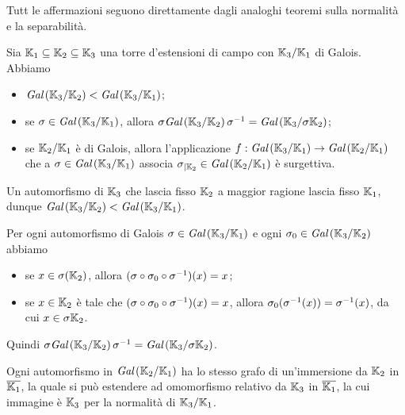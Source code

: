 \Proof Tutt le affermazioni seguono direttamente dagli analoghi teoremi sulla normalit\`a e la separabilit\`a. \EndProof
\begin{Theorem}
	Sia $\mathbb{K}_1 \subseteq \mathbb{K}_2 \subseteq \mathbb{K}_3$ una torre d'estensioni di campo con $\mathbb{K}_3/\mathbb{K}_1$ di Galois. Abbiamo
	\begin{itemize}
		\item $\textit{Gal} \left ( \mathbb{K}_3/\mathbb{K}_2 \right ) < \textit{Gal} \left ( \mathbb{K}_3/\mathbb{K}_1 \right )$;
		\item se $\sigma \in \textit{Gal} \left ( \mathbb{K}_3/\mathbb{K}_1 \right )$, allora $\sigma\textit{Gal} \left ( \mathbb{K}_3/\mathbb{K}_2 \right )\sigma^{-1} = \textit{Gal} \left ( \mathbb{K}_3/\sigma{\mathbb{K}_2} \right )$;
		\item se $\mathbb{K}_2/\mathbb{K}_1$ \`e di Galois, allora l'applicazione $f: \textit{Gal} \left ( \mathbb{K}_3/\mathbb{K}_1 \right ) \rightarrow \textit{Gal} \left ( \mathbb{K}_2/\mathbb{K}_1 \right )$ che a $\sigma \in \textit{Gal} \left ( \mathbb{K}_3/\mathbb{K}_1 \right )$ associa ${\sigma}_{|\mathbb{K}_2} \in \textit{Gal} \left ( \mathbb{K}_2/\mathbb{K}_1 \right )$ \`e surgettiva.
	\end{itemize}
\end{Theorem}
\Proof Un automorfismo di $\mathbb{K}_3$ che lascia fisso $\mathbb{K}_2$ a maggior ragione lascia fisso $\mathbb{K}_1$, dunque $\textit{Gal} \left ( \mathbb{K}_3/\mathbb{K}_2 \right ) < \textit{Gal} \left ( \mathbb{K}_3/\mathbb{K}_1 \right )$.
\par Per ogni automorfismo di Galois $\sigma \in \textit{Gal} \left ( \mathbb{K}_3/\mathbb{K}_1 \right )$ e ogni $\sigma_0 \in \textit{Gal} \left ( \mathbb{K}_3/\mathbb{K}_2 \right )$ abbiamo
\begin{itemize}
	\item se $x \in \sigma(\mathbb{K}_2)$, allora $(\sigma \circ \sigma_0 \circ \sigma^{-1})(x) = x$;
	\item se $x \in \mathbb{K}_2$ \`e tale che $(\sigma \circ \sigma_0 \circ \sigma^{-1})(x) = x$, allora $\sigma_0(\sigma^{-1}(x)) = \sigma^{-1}(x)$, da cui $x \in \sigma{\mathbb{K}_2}$.
\end{itemize}
Quindi $\sigma\textit{Gal} \left ( \mathbb{K}_3/\mathbb{K}_2 \right )\sigma^{-1} = \textit{Gal} \left ( \mathbb{K}_3/\sigma{\mathbb{K}_2} \right )$.
\par Ogni automorfismo in $\textit{Gal} \left ( \mathbb{K}_2/\mathbb{K}_1 \right )$ ha lo stesso grafo di un'immersione da $\mathbb{K}_2$ in $\overline{\mathbb{K}_1}$, la quale si pu\`o estendere ad omomorfismo relativo da $\mathbb{K}_3$ in $\overline{\mathbb{K}_1}$, la cui immagine \`e $\mathbb{K}_3$ per la normalit\`a di $\mathbb{K}_3/\mathbb{K}_1$. \EndProof
